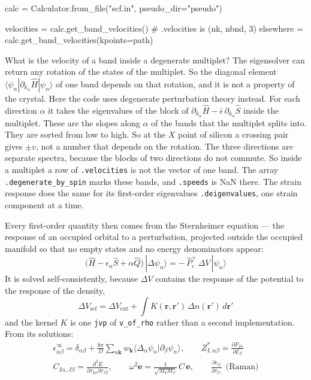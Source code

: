 \documentclass[11pt,a4paper]{article}
\newcommand{\code}[1]{\texttt{\small #1}}
\begin{document}
\begin{pycode}
calc = Calculator.from_file("scf.in", pseudo_dir="pseudo")

velocities = calc.get_band_velocities()          # .velocities is (nk, nbnd, 3)
elsewhere = calc.get_band_velocities(kpoints=path)
\end{pycode}

What is the velocity of a band inside a degenerate multiplet? The eigensolver
can return any rotation of the states of the multiplet. So the diagonal element
$\langle\psi_n|\partial_{k_\alpha}\hat H|\psi_n\rangle$ of one band depends on
that rotation, and it is not a property of the crystal. Here the code uses
degenerate perturbation theory instead. For each direction $\alpha$ it takes the
eigenvalues of the block of $\partial_{k_\alpha}\hat H - \bar\epsilon\,
\partial_{k_\alpha}\hat S$ inside the multiplet. These are the slopes along
$\alpha$ of the bands that the multiplet splits into. They are sorted from low
to high. So at the $X$ point of silicon a crossing pair gives $\pm v$, not a
number that depends on the rotation. The three directions are separate
spectra, because the blocks of two directions do not commute. So inside a
multiplet a row of \code{.velocities} is not the vector of one band. The array
\code{.degenerate\_by\_spin} marks these bands, and \code{.speeds} is NaN there.
The strain response does the same for its first-order eigenvalues
\code{.deigenvalues}, one strain component at a time.

Every first-order quantity then comes from the Sternheimer equation --- the response
of an occupied orbital to a perturbation, projected outside the occupied
manifold so that no empty states and no energy denominators appear:
\begin{equation*}
\big(\hat H - \epsilon_n\hat S + \alpha\hat Q\big)\,|\Delta\psi_n\rangle
  = -\,\hat P_c^{+}\,\Delta V\,|\psi_n\rangle
\end{equation*}
It is solved self-consistently, because $\Delta V$ contains the response of the
potential to the response of the density,
\begin{equation*}
\Delta V_{\mathrm{scf}} = \Delta V_{\mathrm{ext}}
  + \int K(\mathbf r,\mathbf r')\,\Delta n(\mathbf r')\,d\mathbf r'
\end{equation*}
and the kernel $K$ is one \code{jvp} of \code{v\_of\_rho} rather than a second
implementation. From its solutions:
\begin{gather*}
\epsilon^\infty_{\alpha\beta} = \delta_{\alpha\beta}
  + \frac{8\pi}{\Omega}\sum_{n\mathbf k} w_{\mathbf k}
    \langle\Delta_\alpha\psi_n|\partial_\beta\psi_n\rangle,
\qquad
Z^{\ast}_{I,\alpha\beta} = \frac{\partial F_{I\alpha}}{\partial\mathcal E_\beta} \\[3pt]
C_{I\alpha,J\beta} = \frac{\partial^2 E}{\partial\tau_{I\alpha}\partial\tau_{J\beta}},
\qquad
\omega^2\mathbf e = \frac{1}{\sqrt{M_I M_J}}\,C\,\mathbf e,
\qquad
\frac{\partial\epsilon_{ij}}{\partial\tau_{I\gamma}}\ \ \text{(Raman)}
\end{gather*}
\end{document}
